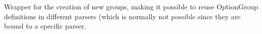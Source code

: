 \documentclass[letterpaper,10pt,english]{sphinxmanual}
\begin{document}

\begin{fulllineitems}
\label{index:encore.utils.OptionGroups}
Wrapper for the creation of new groups, making it possible to reuse
OptionGroup definitions in different parsers (which is normally not
possible since they are bound to a specific parser.

\begin{fulllineitems}
\label{index:encore.utils.OptionGroups.add_group}
\end{fulllineitems}


\end{fulllineitems}

\end{document}
